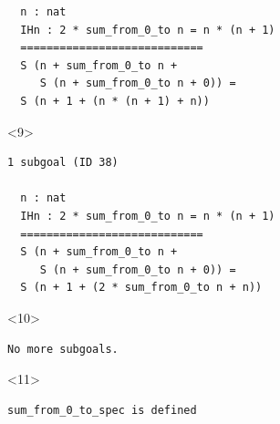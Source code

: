 \documentclass{beamer}
\begin{document}
\begin{frame}[fragile]
\begin{columns}
\begin{column}{0.7\textwidth}
\begin{onlyenv}
\begin{verbatim}
  n : nat
  IHn : 2 * sum_from_0_to n = n * (n + 1)
  ============================
  S (n + sum_from_0_to n +
     S (n + sum_from_0_to n + 0)) =
  S (n + 1 + (n * (n + 1) + n))
    \end{verbatim}
    \endminipage
    \end{onlyenv}

    \begin{onlyenv}<9>
    \minipage[c][0.65\textheight][s]{\columnwidth}
    \begin{verbatim}
1 subgoal (ID 38)
  
  n : nat
  IHn : 2 * sum_from_0_to n = n * (n + 1)
  ============================
  S (n + sum_from_0_to n +
     S (n + sum_from_0_to n + 0)) =
  S (n + 1 + (2 * sum_from_0_to n + n))
    \end{verbatim}
    \endminipage
    \end{onlyenv}

    \begin{onlyenv}<10>
    \minipage[c][0.65\textheight][s]{\columnwidth}
    \vspace{30ex}

    \begin{Verbatim}[fontshape=it]
No more subgoals.
    \end{Verbatim}
    \endminipage
    \end{onlyenv}

    \begin{onlyenv}<11>
    \minipage[c][0.65\textheight][s]{\columnwidth}
    \vspace{30ex}

    \begin{Verbatim}[fontshape=it]
sum_from_0_to_spec is defined
    \end{Verbatim}
    \endminipage
    \end{onlyenv}

    \end{column}
  \end{columns}
\end{frame}
\end{document}
